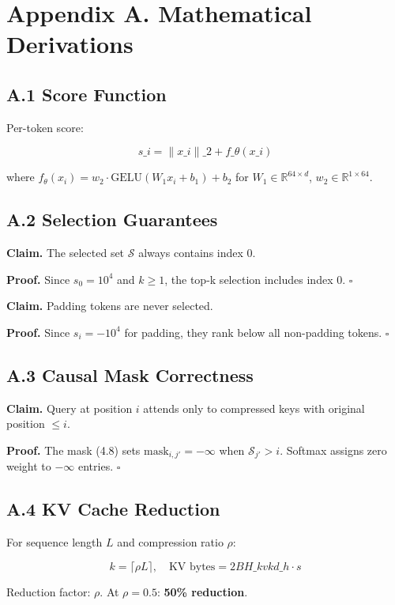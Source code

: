 \section{Appendix A. Mathematical Derivations}

\subsection{A.1 Score Function}

Per-token score:

\[
s\_i = \|x\_i\|\_2 + f\_\theta(x\_i)
\tag{A.1}
\]

where $f_\theta(x_i) = w_2 \cdot \text{GELU}(W_1 x_i + b_1) + b_2$ for 
$W_1 \in \mathbb{R}^{64 \times d}$, $w_2 \in \mathbb{R}^{1 \times 64}$.

\subsection{A.2 Selection Guarantees}

\textbf{Claim.} The selected set $\mathcal{S}$ always contains index 0.

\textbf{Proof.} Since $s_0 = 10^4$ and $k \geq 1$, the top-k selection 
includes index 0. $\square$

\textbf{Claim.} Padding tokens are never selected.

\textbf{Proof.} Since $s_i = -10^4$ for padding, they rank below all non-padding 
tokens. $\square$

\subsection{A.3 Causal Mask Correctness}

\textbf{Claim.} Query at position $i$ attends only to compressed keys with 
original position $\leq i$.

\textbf{Proof.} The mask (4.8) sets $\text{mask}_{i,j'} = -\infty$ when 
$\mathcal{S}_{j'} > i$. Softmax assigns zero weight to $-\infty$ entries. 
$\square$

\subsection{A.4 KV Cache Reduction}

For sequence length $L$ and compression ratio $\rho$:

\[
k = \lceil \rho L \rceil, \quad \text{KV bytes} = 2 B H\_{kv} k d\_h \cdot s
\tag{A.2}
\]

Reduction factor: $\rho$. At $\rho = 0.5$: \textbf{50\% reduction}.

